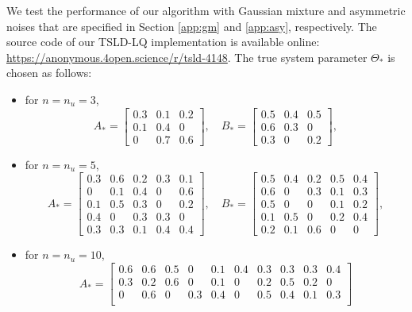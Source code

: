 \documentclass[11pt]{article}
\theoremstyle{plain}
\theoremstyle{definition}
\theoremstyle{remark}
\begin{document}
We test the performance of our algorithm 
with  Gaussian mixture and asymmetric noises that are specified in Section \ref{app:gm} and \ref{app:asy}, respectively. 
The source code of our TSLD-LQ implementation is available online: \url{https://anonymous.4open.science/r/tsld-4148}.
The true system parameter $\Theta_*$ is chosen 
as follows: 
\begin{itemize}
\item for $n=n_u=3$,
\begin{equation*}
A_*=
  \begin{bmatrix}
    0.3  & 0.1  & 0.2           \\
    0.1 & 0.4   & 0\\
    0 & 0.7 & 0.6
    
  \end{bmatrix}
,\quad B_*=
  \begin{bmatrix}
    0.5  & 0.4  & 0.5           \\
    0.6 & 0.3   & 0\\
    0.3 & 0 & 0.2
  \end{bmatrix},
\end{equation*}
\item for $n=n_u=5$, 
\begin{equation*}
A_*=
  \begin{bmatrix}
    0.3  & 0.6 & 0.2& 0.3 &0.1\\
    0 & 0.1 & 0.4 &0 &0.6\\
    0.1 & 0.5 & 0.3 & 0 & 0.2\\
    0.4 & 0 & 0.3 & 0.3 & 0\\
    0.3&0.3&0.1&0.4&0.4
  \end{bmatrix},\quad
    B_*=
  \begin{bmatrix}
    0.5  & 0.4 & 0.2& 0.5 &0.4\\
    0.6 & 0 & 0.3 &0.1 &0.3\\
    0.5 & 0 & 0 &0.1 &0.2\\
    0.1 & 0.5 & 0 & 0.2 &0.4\\
    0.2 & 0.1 & 0.6 & 0 & 0
  \end{bmatrix},
\end{equation*}
\item for $n=n_u=10$,
\begin{equation*}
A_*=
  \begin{bmatrix}
    0.6  & 0.6 & 0.5& 0 &0.1 & 0.4 & 0.3 & 0.3 & 0.3 & 0.4\\
    0.3&0.2&0.6&0&0.1&0&0.2&0.5&0.2&0\\
    0&0.6&0&0.3&0.4&0&0.5&0.4&0.1&0.3\\

\end{bmatrix}
\end{equation*}
\end{itemize}
\end{document}
